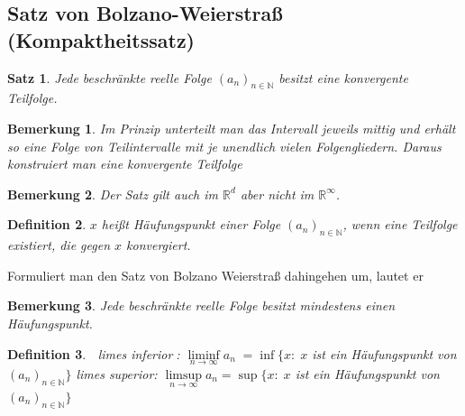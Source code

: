\documentclass[12pt,a4paper]{article}%
\newtheorem{satz}{Satz}[section]
\newtheorem{definition}[satz]{Definition}
\newtheorem{bem}{Bemerkung}[section]
\numberwithin{equation}{section}
\newcommand{\R}{\mathbb{R}} %
\newcommand{\N}{\mathbb{N}}
\numberwithin{equation}{subsection}
\begin{document}
  \subsection{Satz von Bolzano-Weierstraß (Kompaktheitssatz)}
  \begin{satz}
    Jede beschränkte reelle Folge $(a_n)_{n \in \N}$ besitzt eine konvergente Teilfolge.
  \end{satz}
  \begin{bem}
    Im Prinzip unterteilt man das Intervall jeweils mittig und erhält so eine Folge von Teilintervalle mit je unendlich vielen Folgengliedern. Daraus konstruiert man eine konvergente Teilfolge
  \end{bem}  
  \begin{bem}
    Der Satz gilt auch im $\R^d$ aber nicht im $\R^{\infty}$.
  \end{bem}
  \begin{definition}
    $x$ heißt Häufungspunkt einer Folge $(a_n)_{n \in \N}$, wenn eine Teilfolge existiert, die gegen $x$ konvergiert.
  \end{definition}
  Formuliert man den Satz von Bolzano Weierstraß dahingehen um, lautet er
  \begin{bem}
    Jede beschränkte reelle Folge besitzt mindestens einen Häufungspunkt.
  \end{bem}
  \begin{definition}$\;$\newline 
    limes inferior$\;$: $\liminf\limits_{n\rightarrow \infty} a_n \;= \inf\lbrace x:\; x$ ist ein Häufungspunkt von $(a_n)_{n \in \N}\rbrace$ \newline
    limes superior: $\limsup\limits_{n\rightarrow \infty} a_n = \sup\lbrace x:\; x$ ist ein Häufungspunkt von $(a_n)_{n \in \N}\rbrace$
  \end{definition}
  
\end{document}

